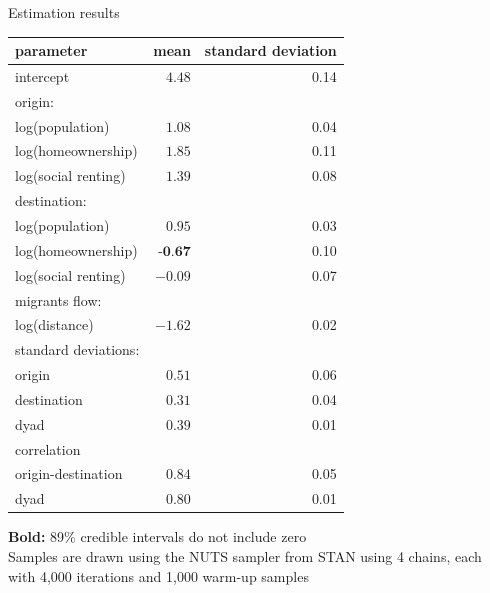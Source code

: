 \documentclass{beamer}
\begin{document}
\begin{frame}{Estimation results}
				\begin{tiny}
\begin{tabular*}{\textwidth}{l @{\extracolsep{\fill}} rr}
				\toprule
				parameter &  mean & standard deviation \\
				\midrule
				intercept  & $\mathbf{4.48}$ & 0.14 \\
				\addlinespace
				origin: \\
				\hspace{1cm} log(population) & $\mathbf{1.08}$ & 0.04 \\
				\hspace{1cm} log(homeownership)  &  $\mathbf{1.85}$ & 0.11 \\
				\hspace{1cm} log(social renting)  &  $\mathbf{1.39}$ & 0.08 \\
				\addlinespace
				destination: \\
				\hspace{1cm} log(population)  &  $\mathbf{0.95}$ & 0.03 \\
				\hspace{1cm} log(homeownership)  & $\textbf{-0.67}$ & 0.10 \\
				\hspace{1cm} log(social renting)  &  $-0.09$ & 0.07 \\
				\addlinespace
				migrants flow: \\
				\hspace{1cm} log(distance) &  $\mathbf{-1.62}$ & 0.02 \\
				\addlinespace
				standard deviations: \\
				\hspace{1cm} origin &  $\mathbf{0.51}$ & 0.06 \\
				\hspace{1cm} destination  & $\mathbf{0.31}$ & 0.04 \\
				\hspace{1cm} dyad  &  $\mathbf{0.39}$ & 0.01 \\
				\addlinespace
				correlation \\
				\hspace{1cm} origin-destination  & $\mathbf{0.84}$ & 0.05 \\
				\hspace{1cm} dyad  &  $\mathbf{0.80}$ & 0.01 \\
				\bottomrule
			  \end{tabular*}
		\end{tiny}
		\tiny{\textbf{Bold:} 89\% credible intervals do not include zero}\\
		\tiny{Samples are drawn using the NUTS sampler from STAN using 4 chains, each with 4,000 iterations and 1,000 warm-up samples}
\end{frame}
\end{document}
